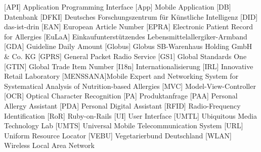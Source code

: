 
\begin{acronym}[MENSSANA] %
	     [API]     {Application Programming Interface}
	     [App]     {Mobile Application}
	      [DB]      {Datenbank}
	    [DFKI]    {Deutsches Forschungszentrum für Künstliche Intelligenz}
	     [DID]     {das-ist-drin}
	     [EAN]     {European Article Number}
	    [EPRA]    {Electronic Patient Record for Allergies}
	   [EuLaA]   {Einkaufunterstützendes Lebensmittelallergiker-Armband}
	     [GDA]     {Guideline Daily Amount}
	  [Globus]  {Globus SB-Warenhaus Holding GmbH \& Co. KG}
	    [GPRS]    {General Packet Radio Service}
	     [GS1]     {Global Standards One}
	    [GTIN]    {Global Trade Item Number}
	    [I18n]    {Internationalisierung}
	     [IRL]     {Innovative Retail Laboratory}
	[MENSSANA]{Mobile Expert and Networking System for Systematical Analysis of Nutrition-based Allergies}
	     [MVC]     {Model-View-Controller}
	     [OCR]     {Optical Character Recognition}
	      [PA]      {Produktanfrage}
	     [PAA]     {Personal Allergy Assistant}
	     [PDA]     {Personal Digital Assistant}
	    [RFID]    {Radio-Frequency Identification}
	     [RoR]     {Ruby-on-Rails}
	      [UI]      {User Interface}
	    [UMTL]    {Ubiquitous Media Technology Lab}
	    [UMTS]    {Universal Mobile Telecommunication System}
	     [URL]     {Uniform Resource Locator}
	    [VEBU]    {Vegetarierbund Deutschland}
	    [WLAN]    {Wireless Local Area Network}
\end{acronym}
